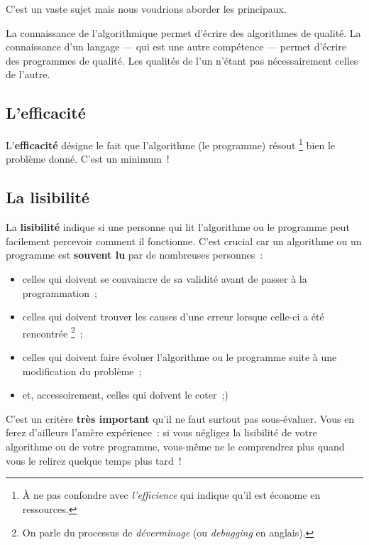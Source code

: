 		C’est un vaste sujet mais nous voudrions aborder les principaux.

		La connaissance de l'algorithmique permet d'écrire des algorithmes de 
		qualité. La connaissance d'un langage — qui est une autre compétence —
		permet d'écrire des programmes de qualité. Les qualités de l'un n'étant 
		pas nécessairement celles de l'autre. 
		
		\subsection{L’efficacité}
			
			L’\textbf{efficacité}
			désigne le fait que l’algorithme (le programme) résout%
			\footnote{%
				À ne pas confondre avec \emph{l’efficience}
				qui indique qu’il est économe en ressources.
			}
			bien le problème donné.
			C’est un minimum~!
		
		\subsection{La lisibilité}
		
			La \textbf{lisibilité} indique si une personne qui lit l’algorithme
			ou le programme peut facilement percevoir comment il fonctionne.
			C’est crucial car un algorithme ou un programme est \textbf{souvent
			lu} par de nombreuses personnes~:
			
			\begin{itemize}
			\item
				celles qui doivent se convaincre de sa validité
				avant de passer à la programmation~;
			\item
				celles qui doivent trouver les causes
				d’une erreur lorsque celle-ci a été rencontrée%
				\footnote{%
					On parle du processus de \emph{déverminage}
					(ou \emph{debugging} en anglais).%
				}~;
			\item
				celles qui doivent faire évoluer l’algorithme
				ou le programme suite à une modification
				du problème~;
			\item
				et, accessoirement, celles qui doivent le coter~;)
			\end{itemize}
			
			C’est un critère \textbf{très important} qu’il ne faut surtout pas
			sous-évaluer.  Vous en ferez d’ailleurs l’amère expérience~: si vous
			négligez la lisibilité de votre algorithme ou de votre programme,
			vous-même ne le comprendrez plus quand vous le relirez quelque temps
			plus tard~!
			
